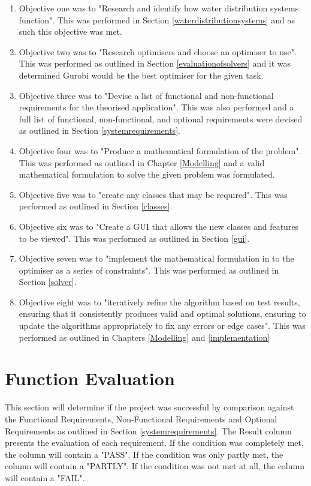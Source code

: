 \begin{enumerate}
    \item Objective one was to "Research and identify how water distribution systems function". This was performed in Section \ref{waterdistributionsystems} and as such this objective was met.
    \item Objective two was to "Research optimisers and choose an optimiser to use". This was performed as outlined in Section \ref{evaluationofsolvers} and it was determined Gurobi would be the best optimiser for the given task.
    \item Objective three was to "Devise a list of functional and non-functional requirements for the theorised application". This was also performed and a full list of functional, non-functional, and optional requirements were devised as outlined in Section \ref{systemrequirements}.
    \item Objective four was to "Produce a mathematical formulation of the problem". This was performed as outlined in Chapter \ref{Modelling} and a valid mathematical formulation to solve the given problem was formulated.
    \item Objective five was to "create any classes that may be required". This was performed as outlined in Section \ref{classes}.
    \item Objective six was to "Create a GUI that allows the new classes and features to be viewed". This was performed as outlined in Section \ref{gui}.
    \item Objective seven was to "implement the mathematical formulation in to the optimiser as a series of constraints". This was performed as outlined in Section \ref{solver}.
    \item Objective eight was to "iteratively refine the algorithm based on test results, ensuring that it consistently produces valid and optimal solutions, ensuring to update the algorithms appropriately to fix any errors or edge cases". This was performed as outlined in Chapters \ref{Modelling} and \ref{implementation}
\end{enumerate}

\section{Function Evaluation}\label{functioneval}
This section will determine if the project was successful by comparison against the Functional Requirements, Non-Functional Requirements and Optional Requirements as outlined in Section \ref{systemrequirements}. The Result column presents the evaluation of each requirement. If the condition was completely met, the column will contain a "PASS". If the condition was only partly met, the column will contain a "PARTLY".  If the condition was not met at all, the column will contain a "FAIL".
